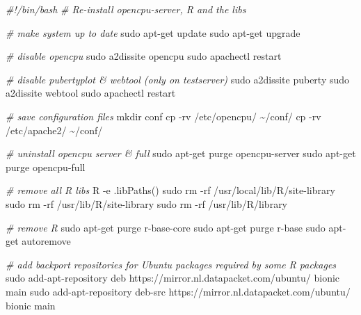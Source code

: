 \documentclass[
]{book}
\newenvironment{Shaded}{\begin{snugshade}}{\end{snugshade}}
\newcommand{\AttributeTok}[1]{\textcolor[rgb]{0.77,0.63,0.00}{#1}}
\newcommand{\CommentTok}[1]{\textcolor[rgb]{0.56,0.35,0.01}{\textit{#1}}}
\newcommand{\ExtensionTok}[1]{#1}
\newcommand{\FunctionTok}[1]{\textcolor[rgb]{0.00,0.00,0.00}{#1}}
\newcommand{\NormalTok}[1]{#1}
\newcommand{\StringTok}[1]{\textcolor[rgb]{0.31,0.60,0.02}{#1}}
\begin{document}
\begin{Shaded}
\begin{Highlighting}[]
\CommentTok{\#!/bin/bash}
\CommentTok{\# Re{-}install opencpu{-}server, R and the libs}

\CommentTok{\# make system up to date}
\FunctionTok{sudo}\NormalTok{ apt{-}get update}
\FunctionTok{sudo}\NormalTok{ apt{-}get upgrade}

\CommentTok{\# disable opencpu}
\FunctionTok{sudo}\NormalTok{ a2dissite opencpu}
\FunctionTok{sudo}\NormalTok{ apachectl restart}

\CommentTok{\# disable pubertyplot \& webtool (only on testserver)}
\FunctionTok{sudo}\NormalTok{ a2dissite puberty}
\FunctionTok{sudo}\NormalTok{ a2dissite webtool}
\FunctionTok{sudo}\NormalTok{ apachectl restart}

\CommentTok{\# save configuration files}
\FunctionTok{mkdir}\NormalTok{ conf}
\FunctionTok{cp} \AttributeTok{{-}rv}\NormalTok{ /etc/opencpu/ \textasciitilde{}/conf/}
\FunctionTok{cp} \AttributeTok{{-}rv}\NormalTok{ /etc/apache2/ \textasciitilde{}/conf/}

\CommentTok{\# uninstall opencpu server \& full}
\FunctionTok{sudo}\NormalTok{ apt{-}get purge opencpu{-}server}
\FunctionTok{sudo}\NormalTok{ apt{-}get purge opencpu{-}full}

\CommentTok{\# remove all R libs}
\ExtensionTok{R} \AttributeTok{{-}e} \StringTok{\textquotesingle{}.libPaths()\textquotesingle{}}
\FunctionTok{sudo}\NormalTok{ rm }\AttributeTok{{-}rf}\NormalTok{ /usr/local/lib/R/site{-}library}
\FunctionTok{sudo}\NormalTok{ rm }\AttributeTok{{-}rf}\NormalTok{ /usr/lib/R/site{-}library}
\FunctionTok{sudo}\NormalTok{ rm }\AttributeTok{{-}rf}\NormalTok{ /usr/lib/R/library}

\CommentTok{\# remove R}
\FunctionTok{sudo}\NormalTok{ apt{-}get purge r{-}base{-}core}
\FunctionTok{sudo}\NormalTok{ apt{-}get purge r{-}base}
\FunctionTok{sudo}\NormalTok{ apt{-}get autoremove}

\CommentTok{\# add backport repositories for Ubuntu packages required by some R packages}
\FunctionTok{sudo}\NormalTok{ add{-}apt{-}repository }\StringTok{\textquotesingle{}deb https://mirror.nl.datapacket.com/ubuntu/ bionic main\textquotesingle{}}
\FunctionTok{sudo}\NormalTok{ add{-}apt{-}repository }\StringTok{\textquotesingle{}deb{-}src https://mirror.nl.datapacket.com/ubuntu/ bionic main\textquotesingle{}}


\end{Highlighting}
\end{Shaded}
\end{document}
